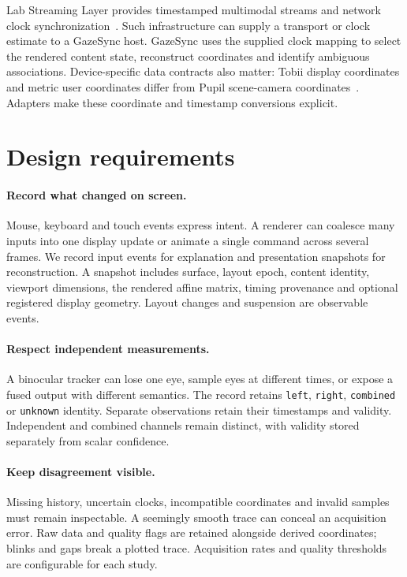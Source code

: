 \documentclass[sigconf,screen,nonacm]{acmart}
\newcommand{\code}[1]{\texttt{#1}}
\begin{document}
Lab Streaming Layer provides timestamped multimodal streams and network clock
synchronization~\cite{lsl}. Such infrastructure can supply a transport or clock
estimate to a GazeSync host. GazeSync uses the supplied clock mapping to select
the rendered content state, reconstruct coordinates and identify ambiguous
associations. Device-specific data contracts also matter: Tobii display coordinates and metric user
coordinates differ from Pupil scene-camera coordinates~\cite{tobii,pupil}.
Adapters make these coordinate and timestamp conversions explicit.

\section{Design requirements}
\paragraph{Record what changed on screen.}
Mouse, keyboard and touch events express intent. A renderer can coalesce many
inputs into one display update or animate a single command across several
frames. We record input events for explanation and presentation snapshots for
reconstruction. A snapshot includes surface, layout epoch, content identity,
viewport dimensions, the rendered affine matrix, timing provenance and optional
registered display geometry. Layout changes and suspension are observable events.

\paragraph{Respect independent measurements.}
A binocular tracker can lose one eye, sample eyes at different times, or expose a
fused output with different semantics. The record retains \code{left},
\code{right}, \code{combined} or \code{unknown} identity. Separate observations
retain their timestamps and validity. Independent and combined channels remain
distinct, with validity stored separately from scalar confidence.

\paragraph{Keep disagreement visible.}
Missing history, uncertain clocks, incompatible coordinates and invalid samples
must remain inspectable. A seemingly smooth trace can conceal an acquisition
error. Raw data and quality flags are retained alongside derived coordinates;
blinks and gaps break a plotted trace. Acquisition rates and quality thresholds
are configurable for each study.
\end{document}
